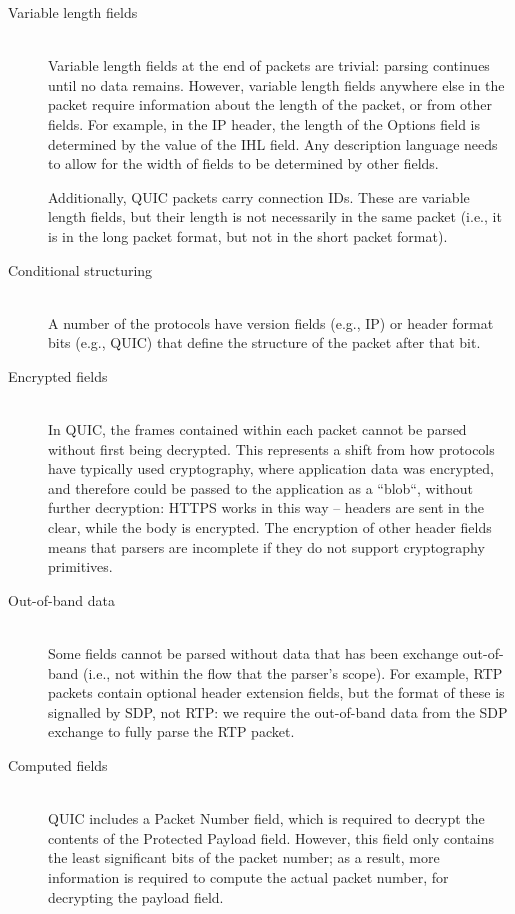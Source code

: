 \documentclass[10pt]{article}
\begin{document}
\begin{description}
	\item[Variable length fields] \hfill \\
	Variable length fields at the end of packets are trivial: parsing continues until no
	data remains. However, variable length fields anywhere else in the packet require
	information about the length of the packet, or from other fields. For example, in the
	IP header, the length of the Options field is determined by the value of the IHL
	field. Any description language needs to allow for the width of fields to be determined
	by other fields.
	
	Additionally, QUIC packets carry connection IDs. These are variable length fields, but
	their length is not necessarily in the same packet (i.e., it is in the long packet
	format, but not in the short packet format).  
	\item[Conditional structuring] \hfill \\
	A number of the protocols have version fields (e.g., IP) or header format bits (e.g.,
	QUIC) that define the structure of the packet after that bit.
	\item[Encrypted fields] \hfill \\
	In QUIC, the frames contained within each packet cannot be parsed without first being
	decrypted. This represents a shift from how protocols have typically used cryptography,
	where application data was encrypted, and therefore could be passed to the application
	as a ``blob``, without further decryption: HTTPS works in this way -- headers are sent
	in the clear, while the body is encrypted. The encryption of other header fields means
	that parsers are incomplete if they do not support cryptography primitives.
	\item[Out-of-band data] \hfill \\
	Some fields cannot be parsed without data that has been exchange out-of-band (i.e.,
	not within the flow that the parser's scope). For example, RTP packets contain
	optional header extension fields, but the format of these is signalled by SDP, not
	RTP: we require the out-of-band data from the SDP exchange to fully parse the RTP
	packet.
	\item[Computed fields] \hfill \\
	QUIC includes a Packet Number field, which is required to decrypt the contents of the
	Protected Payload field. However, this field only contains the least significant bits
	of the packet number; as a result, more information is required to compute the actual
	packet number, for decrypting the payload field.
\end{description}
\end{document}
